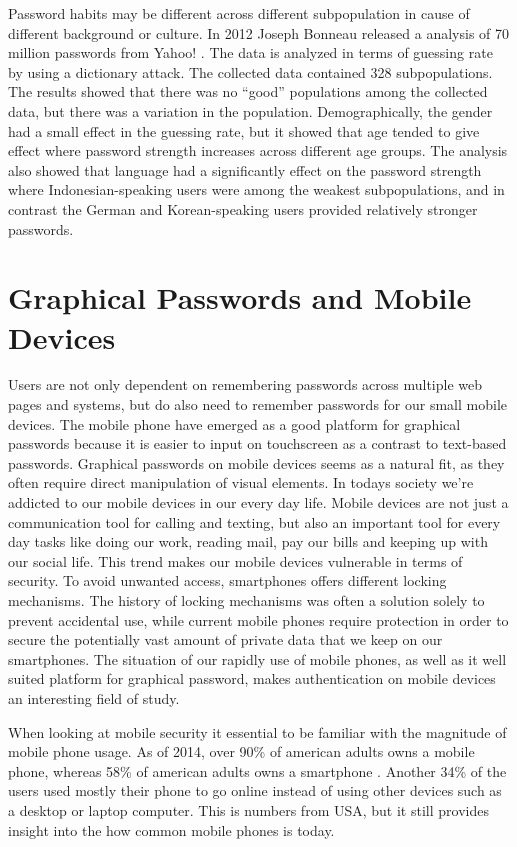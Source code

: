   Password habits may be different across different subpopulation in cause of different background or culture. In 2012 Joseph Bonneau released a analysis of 70 million passwords from Yahoo! \cite{Bonneau2}. The data is analyzed in terms of guessing rate by using a dictionary attack. The collected data contained 328 subpopulations. The results showed that there was no ``good'' populations among the collected data, but there was a variation in the population. Demographically, the gender had a small effect in the guessing rate, but it showed that age tended to give effect where password strength increases across different age groups. The analysis also showed that language had a significantly effect on the password strength where Indonesian-speaking users were among the weakest subpopulations, and in contrast the German and Korean-speaking users provided relatively stronger passwords. 

  

\section{Graphical Passwords and Mobile Devices}
  Users are not only dependent on remembering passwords across multiple web pages and systems, but do also need to remember passwords for our small mobile devices. The mobile phone have emerged as a good platform for graphical passwords because it is easier to input on touchscreen as a contrast to text-based passwords. Graphical passwords on mobile devices seems as a natural fit, as they often require direct manipulation of visual elements. In todays society we're addicted to our mobile devices in our every day life. Mobile devices are not just a communication tool for calling and texting, but also an important tool for every day tasks like doing our work, reading mail, pay our bills and keeping up with our social life. This trend makes our mobile devices vulnerable in terms of security. To avoid unwanted access, smartphones offers different locking mechanisms. The history of locking mechanisms was often a solution solely to prevent accidental use, while current mobile phones require protection in order to secure the potentially vast amount of private data that we keep on our smartphones. The situation of our rapidly use of mobile phones, as well as it well suited platform for graphical password, makes authentication on mobile devices an interesting field of study.

  When looking at mobile security it essential to be familiar with the magnitude of mobile phone usage. As of 2014, over 90\% of american adults owns a mobile phone, whereas 58\% of american adults owns a smartphone \cite{MobileUseage}. Another 34\% of the users used mostly their phone to go online instead of using other devices such as a desktop or laptop computer. This is numbers from USA, but it still provides insight into the how common mobile phones is today.

